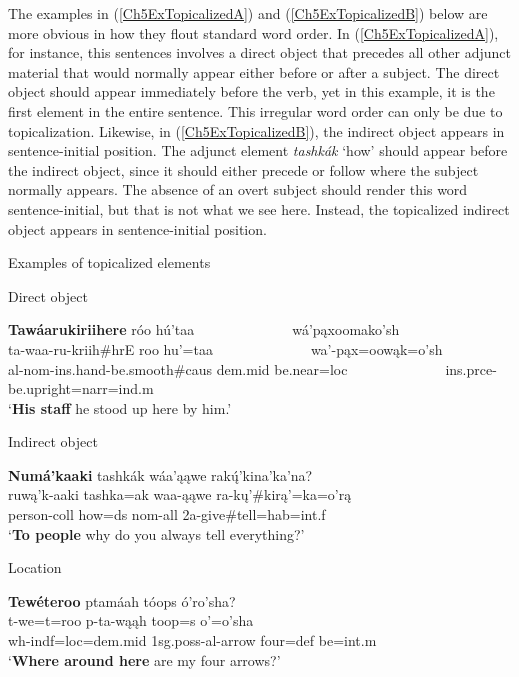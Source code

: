 The examples in (\ref{Ch5ExTopicalizedA}) and (\ref{Ch5ExTopicalizedB}) below are more obvious in how they flout standard word order. In (\ref{Ch5ExTopicalizedA}), for instance, this sentences involves a direct object that precedes all other adjunct material that would normally appear either before or after a subject. The direct object should appear immediately before the verb, yet in this example, it is the first element in the entire sentence. This irregular word order can only be due to topicalization. Likewise, in (\ref{Ch5ExTopicalizedB}), the indirect object appears in sentence-initial position. The adjunct element \textit{tashkák} `how' should appear before the indirect object, since it should either precede or follow where the subject normally appears. The absence of an overt subject should render this word sentence-initial, but that is not what we see here. Instead, the topicalized indirect object appears in sentence-initial position.

\begin{exe}
    \item\label{Ch5ExTopicalized} Examples of topicalized elements

    \begin{xlist}
        \item\label{Ch5ExTopicalizedA} Direct object

        \glll \textbf{Tawáarukiriihere} róo hú'taa ~ ~ ~ ~ ~ ~ ~ ~ wá'pąxoomako'sh\\
        ta-waa-ru-kriih\#hrE roo hu'=taa ~ ~ ~ ~ ~ ~ ~ ~   wa'-pąx=oowąk=o'sh\\
        al-nom-ins.hand-\textnormal{be.smooth}\#caus dem.mid \textnormal{be.near}=loc ~ ~ ~ ~ ~ ~ ~ ~ ins.prce-\textnormal{be.upright}=narr=ind.m\\
        \glt `\textbf{His staff} he stood up here by him.' \citep[1]{hollow1973a}

        \item\label{Ch5ExTopicalizedB} Indirect object

        \glll \textbf{Numá'kaaki} tashkák wáa'ąąwe rakų́'kina'ka'na?\\
        ruwą'k-aaki tashka=ak waa-ąąwe ra-kų'\#kirą'=ka=o'rą\\
        \textnormal{person}-coll \textnormal{how}=ds nom-\textnormal{all} 2a-\textnormal{give}\#\textnormal{tell}=hab=int.f\\
        \glt `\textbf{To people} why do you always tell everything?' \citep[213]{hollow1973a}

        \item\label{Ch5ExTopicalizedC} Location

        \glll \textbf{Tewéteroo} ptamáah tóops ó'ro'sha?\\
        t-we=t=roo p-ta-wąąh toop=s o'=o'sha\\
        wh-indf=loc=dem.mid 1sg.poss-al-\textnormal{arrow} \textnormal{four}=def \textnormal{be}=int.m\\
        \glt `\textbf{Where around here} are my four arrows?' \citep[33]{hollow1973a}
    \end{xlist}
\end{exe}

